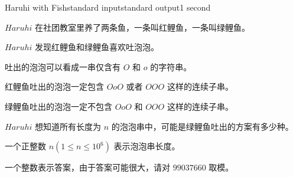 \begin{problem}{Haruhi with Fish}{standard input}{standard output}{1 second}

$Haruhi$ 在社团教室里养了两条鱼，一条叫红鲤鱼，一条叫绿鲤鱼。

$Haruhi$ 发现红鲤鱼和绿鲤鱼喜欢吐泡泡。

吐出的泡泡可以看成一串仅含有 $O$ 和 $o$ 的字符串。

红鲤鱼吐出的泡泡一定包含 $OoO$ 或者 $OOO$ 这样的连续子串。

绿鲤鱼吐出的泡泡一定不包含 $OoO$ 和 $OOO$ 这样的连续子串。

$Haruhi$ 想知道所有长度为 $n$ 的泡泡串中，可能是绿鲤鱼吐出的方案有多少种。

\InputFile

一个正整数 $n(1 \leq  n \leq 10^6)$ 表示泡泡串长度。

\OutputFile

一个整数表示答案，由于答案可能很大，请对 $99037660$ 取模。

\Example
\begin{example}
%
\end{example}
\end{problem}
